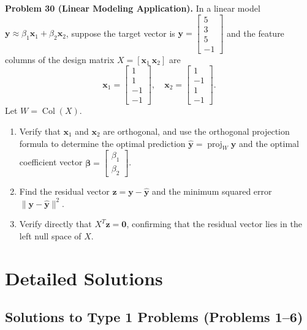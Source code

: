 \documentclass[11pt, letterpaper]{article}
\theoremstyle{definition}
\theoremstyle{remark}
\begin{document}
\textbf{Problem 30 (Linear Modeling Application).} In a linear model $\mathbf{y} \approx \beta_1 \mathbf{x}_1 + \beta_2 \mathbf{x}_2$, suppose the target vector is $\mathbf{y} = \begin{bmatrix} 5 \\ 3 \\ 5 \\ -1 \end{bmatrix}$ and the feature columns of the design matrix $X = [\mathbf{x}_1 \ \mathbf{x}_2]$ are
\[
\mathbf{x}_1 = \begin{bmatrix} 1 \\ 1 \\ -1 \\ -1 \end{bmatrix}, \quad \mathbf{x}_2 = \begin{bmatrix} 1 \\ -1 \\ 1 \\ -1 \end{bmatrix}.
\]
Let $W = \operatorname{Col}(X)$.
\begin{enumerate}[label=(\alph*)]
    \item Verify that $\mathbf{x}_1$ and $\mathbf{x}_2$ are orthogonal, and use the orthogonal projection formula to determine the optimal prediction $\hat{\mathbf{y}} = \operatorname{proj}_W \mathbf{y}$ and the optimal coefficient vector $\boldsymbol{\beta} = \begin{bmatrix} \beta_1 \\ \beta_2 \end{bmatrix}$.
    \item Find the residual vector $\mathbf{z} = \mathbf{y} - \hat{\mathbf{y}}$ and the minimum squared error $\|\mathbf{y} - \hat{\mathbf{y}}\|^2$.
    \item Verify directly that $X^T \mathbf{z} = \mathbf{0}$, confirming that the residual vector lies in the left null space of $X$.
\end{enumerate}

\newpage

\section{Detailed Solutions}

\subsection{Solutions to Type 1 Problems (Problems 1--6)}
\end{document}
